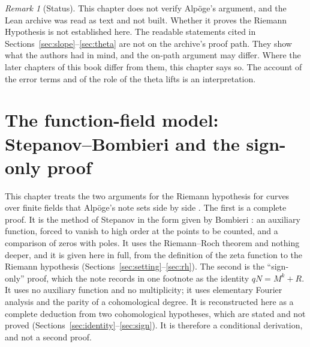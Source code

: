 \documentclass[11pt]{amsbook}
\theoremstyle{plain}
\theoremstyle{definition}
\theoremstyle{remark}
\newtheorem{remark}[theorem]{Remark}
\numberwithin{equation}{section}
\numberwithin{figure}{chapter}
\numberwithin{table}{chapter}
\begin{document}
\begin{remark}[Status]\label{rem:status}
This chapter does not verify Alp\"oge's argument, and the Lean
archive was read as text and not built. Whether it proves the
Riemann Hypothesis is not established here. The readable statements
cited in Sections~\ref{sec:slope}--\ref{sec:theta} are not on the
archive's proof path. They show what the authors had in mind, and
the on-path argument may differ. Where the later chapters of this
book differ from them, this chapter says so. The account of the
error terms and of the role of the theta lifts is an
interpretation.
\end{remark}
\clearpage
\clearpage
\newcommand{\fffloat}[2][tbp]{\begin{figure}[#1]\centering
  \let\fftikz\tikzpicture \let\endfftikz\endtikzpicture
  \renewenvironment{tikzpicture}%
    {\begin{adjustbox}{max width=\linewidth}\fftikz}%
    {\endfftikz\end{adjustbox}}%
  \end{figure}}
\newcommand{\ffbookfloat}[2][tbp]{\begin{figure}[#1]\centering
  \let\fftikz\tikzpicture \let\endfftikz\endtikzpicture
  \renewenvironment{tikzpicture}%
    {\begin{adjustbox}{max width=\linewidth}\fftikz}%
    {\endfftikz\end{adjustbox}}%
  \end{figure}}
\newcommand{\ffabregion}{\begingroup
  \let\ffref\ref
  \def\ffkey{def:admissible}%
  \protected\def\ref##1{\def\fftmp{##1}%
    \ifx\fftmp\ffkey\ffref{def:ff-admissible}\else\ffref{##1}\fi}%
  \fffloat{ab-region}\endgroup}
\chapter[The function-field model]{The function-field model:
  Stepanov--Bombieri and the sign-only proof}
\label{ch:function-fields}

This chapter treats the two arguments for the Riemann hypothesis
for curves over finite fields that Alp\"oge's note sets side by
side \cite{AlpogeRemark2026}. The first is a complete proof. It is
the method of Stepanov
\cite{Stepanov1969} in the form given by Bombieri
\cite{Bombieri1974}: an auxiliary function, forced to vanish to high
order at the points to be counted, and a comparison of zeros with
poles. It uses the Riemann--Roch theorem and nothing deeper, and it
is given here in full, from the definition of the zeta function to
the Riemann hypothesis
(Sections~\ref{sec:setting}--\ref{sec:rh}). The second is the
``sign-only'' proof, which the note records in one footnote as the
identity $qN = M^k + R$. It uses no auxiliary function and no
multiplicity; it uses elementary Fourier analysis and the parity of
a cohomological degree. It is reconstructed here as a complete
deduction from two cohomological hypotheses, which are stated and
not proved (Sections~\ref{sec:identity}--\ref{sec:sign}). It is
therefore a conditional derivation, and not a second proof.
\end{document}

